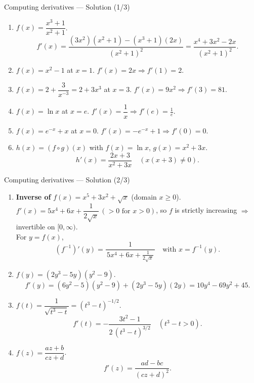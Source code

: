 \documentclass[9pt]{beamer}
\begin{document}
\begin{frame}{Computing derivatives — Solution (1/3)}

\small
\begin{enumerate}[leftmargin=0.55cm, label=(\alph*), rightmargin=0.2cm]

\item $f(x)=\dfrac{x^3+1}{x^2+1}$.
\[
f'(x)=\frac{(3x^2)(x^2+1)-(x^3+1)(2x)}{(x^2+1)^2}
=\boxed{\frac{x^4+3x^2-2x}{(x^2+1)^2}}.
\]

\item $f(x)=x^2-1$ at $x=1$.\; $f'(x)=2x\Rightarrow \boxed{f'(1)=2}$.

\item $f(x)=2+\dfrac{3}{x^{-3}}=2+3x^3$ at $x=3$.\;
$f'(x)=9x^2\Rightarrow \boxed{f'(3)=81}$.

\item $f(x)=\ln x$ at $x=e$.\; $f'(x)=\dfrac1x\Rightarrow \boxed{f'(e)=\tfrac1e}$.

\item $f(x)=e^{-x}+x$ at $x=0$.\; $f'(x)=-e^{-x}+1\Rightarrow \boxed{f'(0)=0}$.

\item $h(x)=(f\circ g)(x)$ with $f(x)=\ln x$, $g(x)=x^2+3x$.
\[
\boxed{h'(x)=\frac{2x+3}{x^2+3x}}
\quad (x(x+3)\neq 0).
\]

\end{enumerate}

\end{frame}

\begin{frame}{Computing derivatives — Solution (2/3)}

\small
\begin{enumerate}[leftmargin=0.55cm, label=(\alph*), start=7, rightmargin=0.2cm]

\item \textbf{Inverse of }$f(x)=x^5+3x^2+\sqrt{x}$ (domain $x\ge 0$). \\
$f'(x)=5x^4+6x+\dfrac{1}{2\sqrt{x}}\, (>0 \text{ for }x>0)$, so $f$ is strictly increasing $\Rightarrow$ invertible on $[0,\infty)$. \\
For $y=f(x)$,
\[
\boxed{(f^{-1})'(y)=\frac{1}{\,5x^4+6x+\tfrac{1}{2\sqrt{x}}\,}}\quad\text{with }x=f^{-1}(y).
\]

\item $f(y)=(2y^3-5y)(y^2-9)$.
\[
\boxed{f'(y)=(6y^2-5)(y^2-9)+(2y^3-5y)(2y)=10y^4-69y^2+45}.
\]

\item $f(t)=\dfrac{1}{\sqrt{t^3-t}}=(t^3-t)^{-1/2}$.
\[
\boxed{f'(t)=-\dfrac{3t^2-1}{2\,(t^3-t)^{3/2}}}
\quad (t^3-t>0).
\]

\item $f(z)=\dfrac{az+b}{cz+d}$.
\[
\boxed{f'(z)=\dfrac{ad-bc}{(cz+d)^2}}.
\]

\end{enumerate}

\end{frame}
\end{document}

